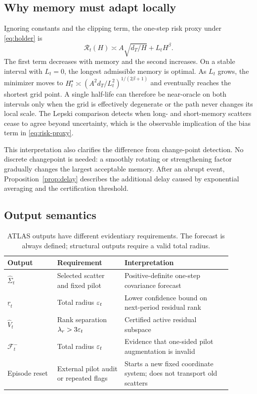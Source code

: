 \subsection{Why memory must adapt locally}

Ignoring constants and the clipping term, the one-step risk proxy under \eqref{eq:holder} is
\begin{equation}
 \mathcal R_t(H)\asymp A\sqrt{d_T/H}+L_tH^\beta.
 \label{eq:risk-proxy}
\end{equation}
The first term decreases with memory and the second increases.  On a stable interval with $L_t=0$, the longest admissible memory is optimal.  As $L_t$ grows, the minimizer moves to
$H_t^\star\asymp(A^2d_T/L_t^2)^{1/(2\beta+1)}$ and eventually reaches the shortest grid point.  A single half-life can therefore be near-oracle on both intervals only when the grid is effectively degenerate or the path never changes its local scale.  The Lepski comparison detects when long- and short-memory scatters cease to agree beyond uncertainty, which is the observable implication of the bias term in \eqref{eq:risk-proxy}.

This interpretation also clarifies the difference from change-point detection.  No discrete changepoint is needed: a smoothly rotating or strengthening factor gradually changes the largest acceptable memory.  After an abrupt event, Proposition~\ref{prop:delay} describes the additional delay caused by exponential averaging and the certification threshold.

\subsection{Output semantics}

\begin{table}[t]
\caption{ATLAS outputs have different evidentiary requirements.  The forecast is always defined; structural outputs require a valid total radius.}
\label{tab:outputs}
\centering
\small
\begin{tabular}{p{0.20\linewidth}p{0.27\linewidth}p{0.43\linewidth}}
\toprule
Output & Requirement & Interpretation \\
\midrule
$\widehat\Sigma_t$ & Selected scatter and fixed pilot & Positive-definite one-step covariance forecast \\
$\underline r_t$ & Total radius $\varepsilon_t$ & Lower confidence bound on next-period residual rank \\
$\widehat V_t$ & Rank separation $\lambda_r>3\varepsilon_t$ & Certified active residual subspace \\
$\mathcal F_t^-$ & Total radius $\varepsilon_t$ & Evidence that one-sided pilot augmentation is invalid \\
Episode reset & External pilot audit or repeated flags & Starts a new fixed coordinate system; does not transport old scatters \\
\bottomrule
\end{tabular}
\end{table}

